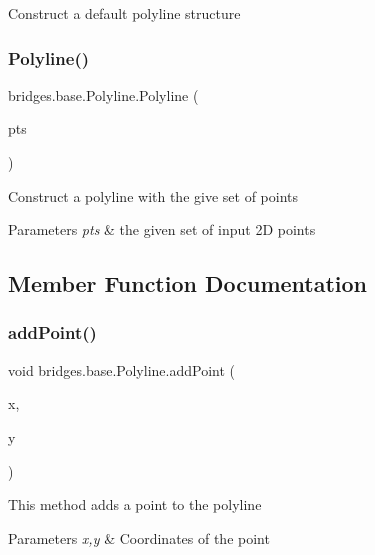 Construct a default polyline structure \mbox{\label{classbridges_1_1base_1_1_polyline_a11d14fddddd6e89e0902e94aa1bac875}} 
\subsubsection{\texorpdfstring{Polyline()}{Polyline()}\hspace{0.1cm}{\footnotesize\ttfamily [2/2]}}
{\footnotesize\ttfamily bridges.\+base.\+Polyline.\+Polyline (\begin{DoxyParamCaption}\item[{Array\+List$<$ Float $>$}]{pts }\end{DoxyParamCaption})}

Construct a polyline with the give set of points


\begin{DoxyParams}{Parameters}
{\em pts} & the given set of input 2D points \\
\hline
\end{DoxyParams}


\subsection{Member Function Documentation}
\mbox{\label{classbridges_1_1base_1_1_polyline_a24b99307181f1a938ea408355984d191}} 
\subsubsection{\texorpdfstring{add\+Point()}{addPoint()}}
{\footnotesize\ttfamily void bridges.\+base.\+Polyline.\+add\+Point (\begin{DoxyParamCaption}\item[{float}]{x,  }\item[{float}]{y }\end{DoxyParamCaption})}

This method adds a point to the polyline


\begin{DoxyParams}{Parameters}
{\em x,y} & Coordinates of the point \\
\hline
\end{DoxyParams}
\mbox{\label{classbridges_1_1base_1_1_polyline_a4ac266909645f8db9b7fcc4836f6069a}} 
